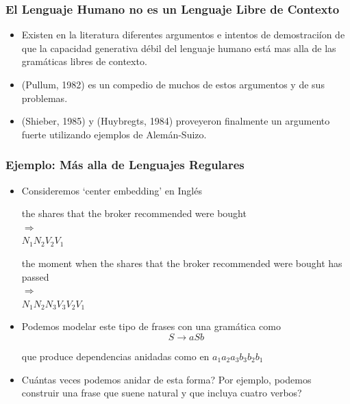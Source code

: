 \documentclass[compress,color=usenames]{beamer}
\begin{document}
\begin{frame}
\frametitle{El Lenguaje Humano no es un Lenguaje Libre de Contexto}

\begin{itemize}

\item Existen en la literatura diferentes argumentos e intentos de 
demostraci\'ion de que la capacidad generativa d\'ebil del lenguaje humano
est\'a mas alla de las gram\'aticas libres de contexto.

\item (Pullum, 1982) es un compedio de muchos de estos argumentos y de sus 
problemas.

\item (Shieber, 1985) y (Huybregts, 1984) proveyeron finalmente un 
argumento fuerte utilizando ejemplos de Alem\'an-Suizo.
\end{itemize}

\end{frame}



\begin{frame}
\frametitle{Ejemplo: M\'as alla de Lenguajes Regulares}

\begin{itemize}
\item Consideremos  `center embedding' en Ingl\'es 


\begin{center}
the shares that the broker recommended were bought\\ $\Rightarrow$\\ $N_1N_2V_2V_1$


the moment when the shares that the broker recommended were bought
has passed\\ $\Rightarrow$\\ $N_1N_2N_3V_3V_2V_1$\pause
\end{center}

\item Podemos modelar este tipo de frases con una gram\'atica como 
$$S \rightarrow a S b$$ 

que produce dependencias anidadas como en $a_1a_2a_3b_3b_2b_1$\pause

\item Cu\'antas veces podemos anidar de esta forma? Por ejemplo, podemos 
construir una frase que suene natural y que incluya cuatro verbos? 
\end{itemize}
\end{frame}
\end{document}
